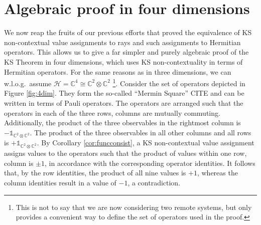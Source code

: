 \section{Algebraic proof in four dimensions}
\label{sec:4dim}
We now reap the fruits of our previous efforts that proved the equivalence of KS non-contextual value assignments to rays and such assignments to Hermitian operators. This allows us to give a far simpler and purely algebraic proof of the KS Theorem in four dimensions, which uses KS non-contextuality in terms of Hermitian operators. For the same reasons as in three dimensions, we can w.l.o.g.\ assume $\mathcal{H=\mathbb{C}}^{4}\cong\mathbb{C}^{2}\otimes\mathbb{C}^{2}$ \footnote{This is not to say that we are now considering two remote systems, but only provides a convenient way to define the set of operators used in the proof.}. Consider the set of operators depicted in Figure \ref{fig:4dim}. They form the so-called “Mermin Square” CITE and can be written in terms of Pauli operators. The operators are arranged such that the operators in each of the three rows, columns are mutually commuting. Additionally, the product of the three observables in the rightmost column is $-\mathbb{1}_{\mathbb{C}^{2}\otimes\mathbb{C}^{2}}$. The product of the three observables in all other columns and all rows is $+\mathbb{1}_{\mathbb{C}^{2}\otimes\mathbb{C}^{2}}$. By Corollary \ref{cor:funcconsist}, a KS non-contextual value assignment assigns values to the operators such that the product of values within one row, column is $\pm1$, in accordance with the corresponding operator identities. It follows that, by the row identities, the product of all nine values is $+1$, whereas the column identities result in a value of $-1$, a contradiction.

